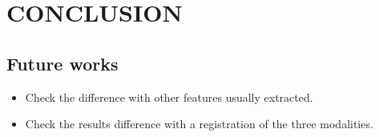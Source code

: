 \section{CONCLUSION}\label{sec:conclusion}

\subsection{Future works}

\begin{itemize}
\item Check the difference with other features usually extracted.
\item Check the results difference with a registration of the three modalities.
\end{itemize}

